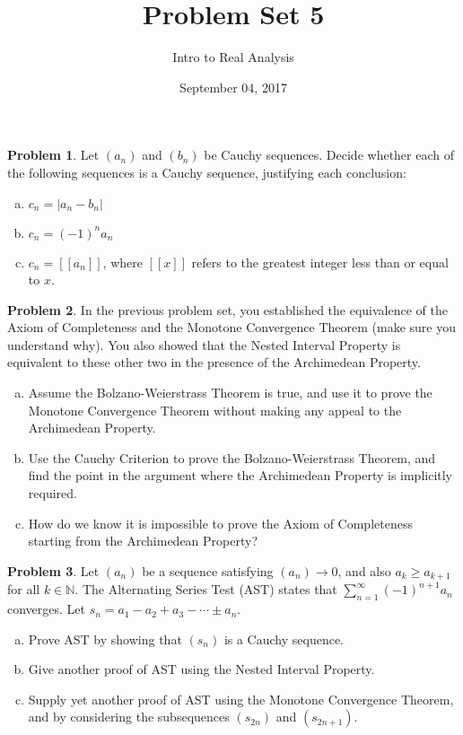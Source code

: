 \documentclass{amsart}
\newcommand{\+}[1]{\ensuremath{\mathbf{#1}}}
\theoremstyle{definition}
\newtheorem{prob}{Problem}
\begin{document}
\title{Problem Set 5}
\date{September 04, 2017}
\author{Intro to Real Analysis}

\maketitle


\begin{prob}
 Let $(a_n)$ and $(b_n)$ be Cauchy sequences.  Decide whether
 each of the following sequences is a Cauchy sequence, justifying
 each conclusion:
 \begin{enumerate}[(a)]
  \item $c_n = |a_n - b_n|$
  \item $c_n = (-1)^{n}a_n$
  \item $c_n = [[a_n]]$, where $[[x]]$
  refers to the greatest integer less than or equal to $x$.
 \end{enumerate}
\end{prob}

\begin{prob}
 In the previous problem set, you established
 the equivalence of the Axiom of Completeness
 and the Monotone Convergence Theorem (make sure
 you understand why).  You also showed
 that the Nested Interval Property is
 equivalent to these other two in the presence
 of the Archimedean Property.
 \begin{enumerate}[(a)]
  \item Assume the Bolzano-Weierstrass Theorem is true,
  and use it to prove the Monotone Convergence Theorem
  without making any appeal to the Archimedean Property.
  \item Use the Cauchy Criterion to prove the 
  Bolzano-Weierstrass Theorem, and find the point
  in the argument where the Archimedean Property is
  implicitly required.
  \item How do we know it is impossible to prove
  the Axiom of Completeness starting from the Archimedean Property?
 \end{enumerate}
\end{prob}

\begin{prob}
 Let $(a_n)$ be a sequence satisfying $(a_n) \to 0$,
 and also $a_k \geq a_{k+1}$ for all $k \in \mathbb{N}$.
 The Alternating Series Test (AST) states that
 $\sum^{\infty}_{n=1}(-1)^{n+1}a_n$ converges.
 Let $s_n = a_1 - a_2 + a_3 - \cdots \pm a_n$.
 \begin{enumerate}[(a)]
  \item Prove AST by showing that
  $(s_n)$ is a Cauchy sequence.
  \item Give another proof of AST using the Nested Interval Property.
  \item Supply yet another proof of AST using the Monotone
  Convergence Theorem, and by considering the subsequences
  $(s_{2n})$ and $(s_{2n+1})$.
 \end{enumerate}
\end{prob}
\end{document}
